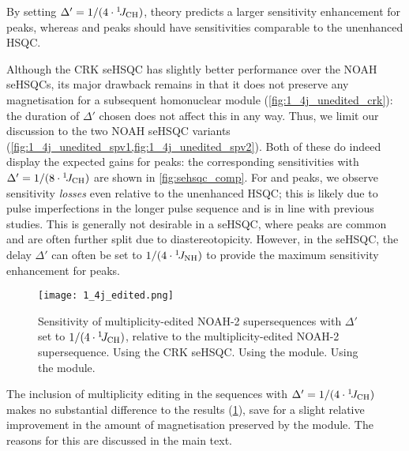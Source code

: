 By setting $\Delta' = 1/(4\cdot\onejch)$, theory predicts a larger sensitivity enhancement for  peaks, whereas  and  peaks should have sensitivities comparable to the unenhanced HSQC.

Although the CRK seHSQC has slightly better performance over the NOAH seHSQCs, its major drawback remains in that it does not preserve any  magnetisation for a subsequent homonuclear module (\cref{fig:1_4j_unedited_crk}): the duration of $\Delta'$ chosen does not affect this in any way.
Thus, we limit our discussion to the two NOAH seHSQC variants (\cref{fig:1_4j_unedited_spv1,fig:1_4j_unedited_spv2}).
Both of these do indeed display the expected gains for  peaks: the corresponding sensitivities with $\Delta' = 1/(8\cdot\onejch)$ are shown in \cref{fig:sehsqc_comp}.
For  and  peaks, we observe sensitivity \textit{losses} even relative to the unenhanced HSQC; this is likely due to pulse imperfections in the longer pulse sequence and is in line with previous studies.\autocite{Schleucher1994JBNMR}
This is generally not desirable in a \carbon{} seHSQC, where  peaks are common and are often further split due to diastereotopicity.
However, in the \nitrogen{} seHSQC, the delay $\Delta'$ can often be set to $1/(4\cdot\onejnh)$ to provide the maximum sensitivity enhancement for  peaks.

\begin{figure}[H]
    \centering
    \texttt{[image: 1\_4j\_edited.png]}
    {\label{fig:1_4j_edited_crk}}
    {\label{fig:1_4j_edited_spv1}}
    {\label{fig:1_4j_edited_spv2}}
    \caption{
        Sensitivity of multiplicity-edited NOAH-2  supersequences with $\Delta'$ set to $1/(4\cdot\onejch)$, relative to the multiplicity-edited NOAH-2  supersequence.
        \textbf{} Using the CRK seHSQC.
        \textbf{} Using the \noahSpa{} module.
        \textbf{} Using the \noahSpb{} module.
        \andro{}
    }
    \label{fig:1_4j_edited}
\end{figure}

The inclusion of multiplicity editing in the sequences with $\Delta' = 1/(4\cdot\onejch)$ makes no substantial difference to the results (\cref{fig:1_4j_edited}), save for a slight relative improvement in the amount of  magnetisation preserved by the \noahSpb{} module.
The reasons for this are discussed in the main text.

